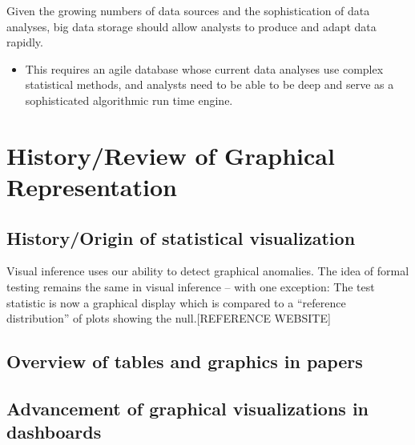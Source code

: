 \documentclass[print]{nuthesis}
\providecommand{\tightlist}{%
  \setlength{\itemsep}{0pt}\setlength{\parskip}{0pt}}
\begin{document}
Given the growing numbers of data sources and the sophistication of data analyses, big data storage should allow analysts to produce and adapt data rapidly.

\begin{itemize}
\tightlist
\item
  This requires an agile database whose current data analyses use complex statistical methods, and analysts need to be able to be deep and serve as a sophisticated algorithmic run time engine.
\end{itemize}

\hypertarget{historyreview-of-graphical-representation}{%
\section{History/Review of Graphical Representation}\label{historyreview-of-graphical-representation}}

\hypertarget{historyorigin-of-statistical-visualization}{%
\subsection{History/Origin of statistical visualization}\label{historyorigin-of-statistical-visualization}}

Visual inference uses our ability to detect graphical anomalies. The idea of formal testing remains the same in visual inference -- with one exception: The test statistic is now a graphical display which is compared to a ``reference distribution'' of plots showing the null.{[}REFERENCE WEBSITE{]}

\hypertarget{overview-of-tables-and-graphics-in-papers}{%
\subsection{Overview of tables and graphics in papers}\label{overview-of-tables-and-graphics-in-papers}}

\hypertarget{advancement-of-graphical-visualizations-in-dashboards}{%
\subsection{Advancement of graphical visualizations in dashboards}\label{advancement-of-graphical-visualizations-in-dashboards}}
\end{document}
